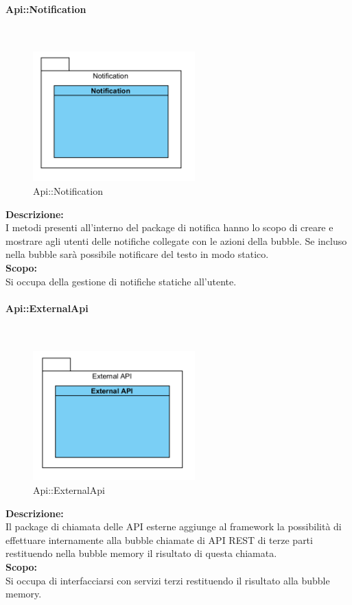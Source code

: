 \begin{samepage}
\paragraph{Api\-::Notification}\label{api-notifica}\mbox{}\\
\nopagebreak
\begin{figure}[H]
	\centering
	\includegraphics[height=5cm]{diagrammi_img/classi_e_package/api_notifica.png}
	\caption{Api\-::Notification}
\end{figure}
\end{samepage}
\textbf{Descrizione:}\\ 
I metodi presenti all'interno del package di notifica hanno lo scopo di creare e mostrare agli utenti delle notifiche collegate con le azioni della bubble. Se incluso nella bubble sarà possibile notificare del testo in modo statico.\\
\textbf{Scopo:}\\
Si occupa della gestione di notifiche statiche all'utente.\\

\begin{samepage}
\paragraph{Api\-::External\-Api}\label{api-esterne}\mbox{}\\
\nopagebreak
\begin{figure}[H]
	\centering
	\includegraphics[height=5cm]{diagrammi_img/classi_e_package/api_esterne.png}
	\caption{Api\-::External\-Api}
\end{figure}
\end{samepage}
\textbf{Descrizione:}\\ 
Il package di chiamata delle API esterne aggiunge al framework la possibilità di effettuare internamente alla bubble chiamate di API REST di terze parti restituendo nella bubble memory il risultato di questa chiamata. \\
\textbf{Scopo:}\\
Si occupa di interfacciarsi con servizi terzi restituendo il risultato alla bubble memory.\\

